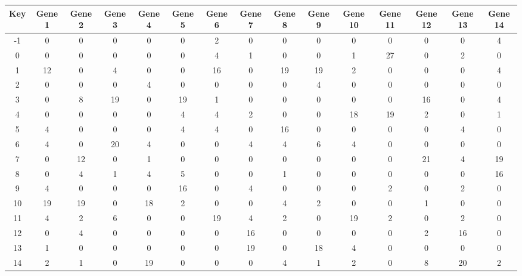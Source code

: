 \begin{tabular}{|c|c|c|c|c|c|c|c|c|c|c|c|c|c|c|}
\hline
Key & Gene 1 & Gene 2 & Gene 3 & Gene 4 & Gene 5 & Gene 6 & Gene 7 & Gene 8 & Gene 9 & Gene 10 & Gene 11 & Gene 12 & Gene 13 & Gene 14 \\
\hline
-1 & 0 & 0 & 0 & 0 & 0 & 2 & 0 & 0 & 0 & 0 & 0 & 0 & 0 & 4 \\
0 & 0 & 0 & 0 & 0 & 0 & 4 & 1 & 0 & 0 & 1 & 27 & 0 & 2 & 0 \\
1 & 12 & 0 & 4 & 0 & 0 & 16 & 0 & 19 & 19 & 2 & 0 & 0 & 0 & 4 \\
2 & 0 & 0 & 0 & 4 & 0 & 0 & 0 & 0 & 4 & 0 & 0 & 0 & 0 & 0 \\
3 & 0 & 8 & 19 & 0 & 19 & 1 & 0 & 0 & 0 & 0 & 0 & 16 & 0 & 4 \\
4 & 0 & 0 & 0 & 0 & 4 & 4 & 2 & 0 & 0 & 18 & 19 & 2 & 0 & 1 \\
5 & 4 & 0 & 0 & 0 & 4 & 4 & 0 & 16 & 0 & 0 & 0 & 0 & 4 & 0 \\
6 & 4 & 0 & 20 & 4 & 0 & 0 & 4 & 4 & 6 & 4 & 0 & 0 & 0 & 0 \\
7 & 0 & 12 & 0 & 1 & 0 & 0 & 0 & 0 & 0 & 0 & 0 & 21 & 4 & 19 \\
8 & 0 & 4 & 1 & 4 & 5 & 0 & 0 & 1 & 0 & 0 & 0 & 0 & 0 & 16 \\
9 & 4 & 0 & 0 & 0 & 16 & 0 & 4 & 0 & 0 & 0 & 2 & 0 & 2 & 0 \\
10 & 19 & 19 & 0 & 18 & 2 & 0 & 0 & 4 & 2 & 0 & 0 & 1 & 0 & 0 \\
11 & 4 & 2 & 6 & 0 & 0 & 19 & 4 & 2 & 0 & 19 & 2 & 0 & 2 & 0 \\
12 & 0 & 4 & 0 & 0 & 0 & 0 & 16 & 0 & 0 & 0 & 0 & 2 & 16 & 0 \\
13 & 1 & 0 & 0 & 0 & 0 & 0 & 19 & 0 & 18 & 4 & 0 & 0 & 0 & 0 \\
14 & 2 & 1 & 0 & 19 & 0 & 0 & 0 & 4 & 1 & 2 & 0 & 8 & 20 & 2 \\
\hline
\end{tabular}